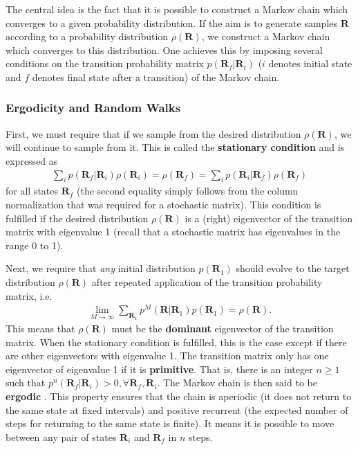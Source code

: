 \documentclass[twoside,english]{uiofysmaster}
\begin{document}
The central idea is the fact that it is possible to construct a Markov chain which converges to a given probability distribution. If the aim is to generate samples $\bm{R}$ according to a probability distribution $\rho(\bm{R})$, we construct a Markov chain which converges to this distribution. One achieves this by imposing several conditions on the transition probability matrix $p(\bm{R}_f|\bm{R}_i)$ ($i$ denotes initial state and $f$ denotes final state after a transition) of the Markov chain. 


\subsubsection{Ergodicity and Random Walks}
First, we must require that if we sample from the desired distribution $\rho(\bm{R})$, we will continue to sample from it. This is called the \textbf{stationary condition} and is expressed as
\begin{align}
	\sum_i p(\bm{R}_f|\bm{R}_i) \rho (\bm{R}_i) = \rho(\bm{R}_f) = \sum_i p(\bm{R}_i|\bm{R}_f) \rho (\bm{R}_f) 
\end{align}
for all states $\bm{R}_f$ (the second equality simply follows from the column normalization that was required for a stochastic matrix). This condition is fulfilled if the desired distribution $\rho(\bm{R})$ is a (right) eigenvector of the transition matrix with eigenvalue 1 (recall that a stochastic matrix has eigenvalues in the range 0 to 1). 

Next, we require that \textit{any} initial distribution $p(\bm{R}_1)$ should evolve to the target distribution $\rho(\bm{R})$ after repeated application of the transition probability matrix, i.e.
\begin{align}
	\lim_{M \to \infty} \sum_{\bm{R}_1} p^M (\bm{R}| \bm{R}_1) p (\bm{R}_1) = \rho (\bm{R}) .
\end{align}
This means that $\rho(\bm{R})$ must be the \textbf{dominant} eigenvector of the transition matrix. When the stationary condition is fulfilled, this is the case except if there are other eigenvectors with eigenvalue 1. The transition matrix only has one eigenvector of eigenvalue 1 if it is \textbf{primitive}. That is, there is an integer $n\geq 1$ such that $p^n (\bm{R}_f| \bm{R}_i) > 0, \forall \bm{R}_f, \bm{R}_i$. The Markov chain is then said to be \textbf{ergodic} \cite{Toulouse2016}. This property ensures that the chain is aperiodic (it does not return to the same state at fixed intervals) and positive recurrent (the expected number of steps for returning to the same state is finite). It means it is possible to move between any pair of states $\bm{R}_i$ and $\bm{R}_f$ in $n$ steps.
\end{document}
